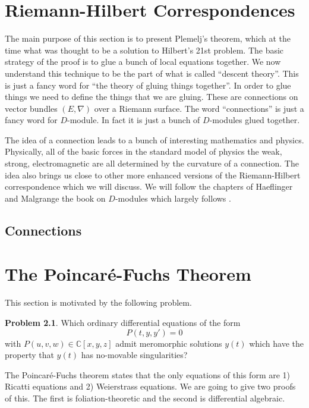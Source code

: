 \documentclass[]{book}
\numberwithin{equation}{section}
\theoremstyle{definition}
\newtheorem{problem}[theorem]{Problem}
\theoremstyle{remark}
\newcommand{\CC}{\mathbb{C}}
\begin{document}
\chapter[Riemann-Hilbert]{Riemann-Hilbert Correspondences}
The main purpose of this section is to present Plemelj's theorem, which at the time what was thought to be a solution to Hilbert's 21st problem.
The basic strategy of the proof is to glue a bunch of local equations together. 
We now understand this technique to be the part of what is called ``descent theory''. 
This is just a fancy word for ``the theory of gluing things together''.  
In order to glue things we need to define the things that we are gluing. 
These are connections on vector bundles $(E,\nabla)$ over a Riemann surface. 
The word ``connections'' is just a fancy word for $D$-module. 
In fact it is just a bunch of $D$-modules glued together. 
 
The idea of a connection leads to a bunch of interesting mathematics and physics. 
Physically, all of the basic forces in the standard model of physics the weak, strong, electromagnetic are all determined by the curvature of a connection.
The idea also brings us close to other more enhanced versions of the Riemann-Hilbert correspondence which we will discuss. 
We will follow the chapters of Haeflinger and Malgrange the book on $D$-modules  \cite[Chapters III, IV]{Borel1987} which largely follows \cite{Deligne1970}.

\section{Connections}


\chapter[Poincar\'{e}-Fuchs]{The Poincar\'{e}-Fuchs Theorem}

This section is motivated by the following problem.
\begin{problem}
Which ordinary differential equations of the form
	  $$ P(t,y,y') =0 $$
with $P(u,v,w) \in \CC[x,y,z]$ admit meromorphic solutions $y(t)$ which have the property that $y(t)$ has no-movable singularities? 
\end{problem}
The Poincar\'e-Fuchs theorem states that the only equations of this form are 1) Ricatti equations and 2) Weierstrass equations. 
We are going to give two proofs of this. 
The first is foliation-theoretic and the second is differential algebraic. 
\end{document}
